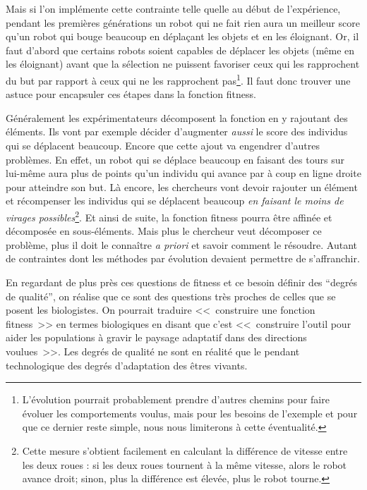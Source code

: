 Mais si l'on implémente cette contrainte telle quelle au début de l'expérience, pendant les premières générations un robot qui ne fait rien aura un meilleur score qu'un robot qui bouge beaucoup en déplaçant les objets et en les éloignant. Or, il faut d'abord que certains robots soient capables de déplacer les objets (même en les éloignant) avant que la sélection ne puissent favoriser ceux qui les rapprochent du but par rapport à ceux qui ne les rapprochent pas\footnote{L'évolution pourrait probablement prendre d'autres chemins pour faire évoluer les comportements voulus, mais pour les besoins de l'exemple et pour que ce dernier reste simple, nous nous limiterons à cette éventualité.}. Il faut donc trouver une astuce pour encapsuler ces étapes dans la fonction fitness.

Généralement les expérimentateurs décomposent la fonction en y rajoutant des éléments. Ils vont par exemple décider d'augmenter \emph{aussi} le score des individus qui se déplacent beaucoup. Encore que cette ajout va engendrer d'autres problèmes. En effet, un robot qui se déplace beaucoup en faisant des tours sur lui-même aura plus de points qu'un individu qui avance par à coup en ligne droite pour atteindre son but. Là encore, les chercheurs vont devoir rajouter un élément et récompenser les individus qui se déplacent beaucoup \emph{en faisant le moins de virages possibles}\footnote{Cette mesure s'obtient facilement en calculant la différence de vitesse entre les deux roues : si les deux roues tournent à la même vitesse, alors le robot avance droit; sinon, plus la différence est élevée, plus le robot tourne.}. Et ainsi de suite, la fonction fitness pourra être affinée et décomposée en sous-éléments. Mais plus le chercheur veut décomposer ce problème,  plus il doit le connaître \emph{a priori} et savoir comment le résoudre. Autant de contraintes dont  les méthodes par évolution devaient permettre de s'affranchir.

En regardant de plus près ces questions de fitness et ce besoin définir des ``degrés de qualité'', on réalise que ce sont des questions très proches de celles que se posent les biologistes.
On pourrait traduire <<~construire une fonction fitness~>> en termes biologiques en disant que c'est <<~construire l'outil pour aider les populations à gravir le paysage adaptatif dans des directions voulues~>>. Les degrés de qualité ne sont en réalité que le pendant technologique des degrés d'adaptation des êtres vivants.

